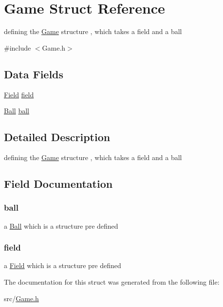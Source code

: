 \hypertarget{struct_game}{\section{Game Struct Reference}
\label{struct_game}
}


defining the \hyperlink{struct_game}{Game} structure , which takes a field and a ball  




{\ttfamily \#include $<$Game.\-h$>$}

\subsection*{Data Fields}
\begin{DoxyCompactItemize}
\item 
\hyperlink{struct_field}{Field} \hyperlink{struct_game_a7dcfc38e2de5dafd89e3d4bda9760010}{field}
\item 
\hyperlink{struct_ball}{Ball} \hyperlink{struct_game_a15de41d45a60a7649d561f53ca88352c}{ball}
\end{DoxyCompactItemize}


\subsection{Detailed Description}
defining the \hyperlink{struct_game}{Game} structure , which takes a field and a ball 

\subsection{Field Documentation}
\hypertarget{struct_game_a15de41d45a60a7649d561f53ca88352c}{
\subsubsection[{ball}]{ ball}}\label{struct_game_a15de41d45a60a7649d561f53ca88352c}
a \hyperlink{struct_ball}{Ball} which is a structure pre defined \hypertarget{struct_game_a7dcfc38e2de5dafd89e3d4bda9760010}{
\subsubsection[{field}]{ field}}\label{struct_game_a7dcfc38e2de5dafd89e3d4bda9760010}
a \hyperlink{struct_field}{Field} which is a structure pre defined 

The documentation for this struct was generated from the following file\-:\begin{DoxyCompactItemize}
\item 
src/\hyperlink{_game_8h}{Game.\-h}\end{DoxyCompactItemize}
